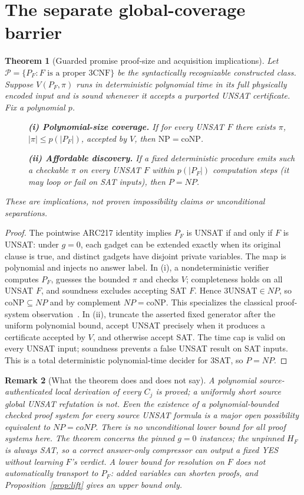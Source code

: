 \documentclass[11pt]{article}
\newtheorem{theorem}{Theorem}
\newtheorem{remark}[theorem]{Remark}
\begin{document}
\section{The separate global-coverage barrier}
\begin{theorem}[Guarded promise proof-size and acquisition implications]\label{thm:cover}
Let $\mathcal P=\{P_F:F\text{ is a proper }3\mathrm{CNF}\}$ be the syntactically recognizable constructed class. Suppose $V(P_F,\pi)$ runs in deterministic polynomial time in its full physically encoded input and is \emph{sound} whenever it accepts a purported UNSAT certificate. Fix a polynomial $p$.
\begin{description}
\item[]\textbf{(i) Polynomial-size coverage.} If for every UNSAT $F$ there exists $\pi$, $|\pi|\le p(|P_F|)$, accepted by $V$, then $\mathrm{NP}=\mathrm{coNP}$.
\item[]\textbf{(ii) Affordable discovery.} If a fixed deterministic procedure emits such a checkable $\pi$ on every UNSAT $F$ within $p(|P_F|)$ computation steps (it may loop or fail on SAT inputs), then $P=NP$.
\end{description}
These are implications, not proven impossibility claims or unconditional separations.
\end{theorem}
\begin{proof}
The pointwise ARC217 identity implies $P_F$ is UNSAT if and only if $F$ is UNSAT: under $g=0$, each gadget can be extended exactly when its original clause is true, and distinct gadgets have disjoint private variables. The map is polynomial and injects no answer label. In (i), a nondeterministic verifier computes $P_F$, guesses the bounded $\pi$ and checks $V$; completeness holds on all UNSAT $F$, and soundness excludes accepting SAT $F$. Hence $3\mathrm{UNSAT}\in NP$, so $\mathrm{coNP}\subseteq NP$ and by complement $NP=\mathrm{coNP}$. This specializes the classical proof-system observation~\cite{cook1979}. In (ii), truncate the asserted fixed generator after the uniform polynomial bound, accept UNSAT precisely when it produces a certificate accepted by $V$, and otherwise accept SAT. The time cap is valid on every UNSAT input; soundness prevents a false UNSAT result on SAT inputs. This is a total deterministic polynomial-time decider for 3SAT, so $P=NP$.
\end{proof}
\begin{remark}[What the theorem does and does not say]
A polynomial source-authenticated \emph{local} derivation of every $C_j$ is proved; a uniformly short source \emph{global} UNSAT refutation is not. Even the existence of a polynomial-bounded checked proof system for every source UNSAT formula is a major open possibility equivalent to $NP=coNP$. There is no unconditional lower bound for all proof systems here. The theorem concerns the pinned $g=0$ instances; the unpinned $H_F$ is always SAT, so a correct answer-only compressor can output a fixed YES without learning $F$'s verdict. A lower bound for resolution on $F$ does not automatically transport to $P_F$: added variables can shorten proofs, and Proposition~\ref{prop:lift} gives an \emph{upper} bound only.
\end{remark}
\end{document}
